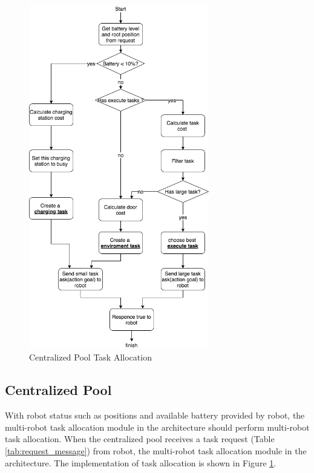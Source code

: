 \begin{figure}[htbp]
    \centering
    \includegraphics[width = 0.7\textwidth]{content/images/ch4/centralized_task_select.drawio.png}
    \caption{Centralized Pool Task Allocation}
    \label{fig:centralized_task_allocation}
\end{figure}

\subsection{Centralized Pool}
With robot status such as positions and available battery provided by robot, the multi-robot task allocation module in the architecture should perform multi-robot task allocation. 
When the centralized pool receives a task request (Table \ref{tab:request_message}) from robot,  the multi-robot task allocation module in the architecture. The implementation of task allocation is shown in Figure \ref{fig:centralized_task_allocation}. 

